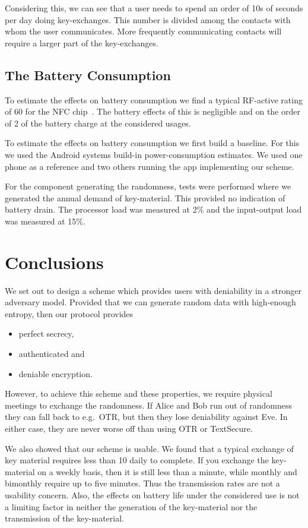 Considering this, we can see that a user needs to spend an order of 10s of 
seconds per day doing key-exchanges.
This number is divided among the contacts with whom the user communicates.
More frequently communicating contacts will require a larger part of the 
key-exchanges.

\subsection{The Battery Consumption}
\label{sec:Battery}
To estimate the effects on battery consumption we find a typical RF-active 
rating of \unit{60}{\milli\ampere} for the NFC chip~\cite{NFCController}.
The battery effects of this is negligible and on the order of 
\unit{2}{\text{\textperthousand}} of the battery charge at the considered 
usages.

To estimate the effects on battery consumption we first build a baseline.
For this we used the Android systems build-in power-consumption estimates.
We used one phone as a reference and two others running the app implementing 
our scheme.

For the component generating the randomness, tests were performed where we 
generated the annual demand of key-material.
This provided no indication of battery drain.
The processor load was measured at \unit{2}{\%} and the input-output load was 
  measured at \unit{15}{\%}. 


\section{Conclusions}
\label{sec:Conclusions}

We set out to design a scheme which provides users with deniability in 
a stronger adversary model.
Provided that we can generate random data with high-enough entropy, then our 
protocol provides
\begin{itemize}
  \item perfect secrecy,
  \item authenticated and
  \item deniable encryption.
\end{itemize}
However, to achieve this scheme and these properties, we require physical 
meetings to exchange the randomness.
If Alice and Bob run out of randomness they can fall back to e.g.~\ac{OTR}, but 
then they lose deniability against Eve.
In either case, they are never worse off than using \ac{OTR} or TextSecure.

We also showed that our scheme is usable.
We found that a typical exchange of key material requires less than 
\unit{10}{\second} daily to complete.
If you exchange the key-material on a weekly basis, then it is still less than 
a minute, while monthly and bimonthly require up to five minutes.
Thus the transmission rates are not a usability concern.
Also, the effects on battery life under the considered use is not a limiting 
factor in neither the generation of the key-material nor the transmission of 
the key-material.

